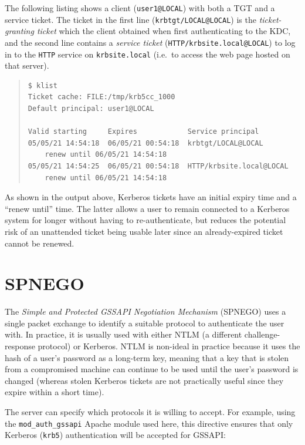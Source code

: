 \documentclass[12pt]{report}
\begin{document}
The following listing shows a client (\verb+user1@LOCAL+) with both a TGT and a service ticket. The ticket in the first line (\verb+krbtgt/LOCAL@LOCAL+) is the \textit{ticket-granting ticket} which the client obtained when first authenticating to the KDC, and the second line contains a \textit{service ticket} (\verb+HTTP/krbsite.local@LOCAL+) to log in to the \verb+HTTP+ service on \verb+krbsite.local+ (i.e.\ to access the web page hosted on that server).

\begin{quote}
\begin{samepage}
\begin{verbatim}
$ klist
Ticket cache: FILE:/tmp/krb5cc_1000
Default principal: user1@LOCAL

Valid starting     Expires            Service principal
05/05/21 14:54:18  06/05/21 00:54:18  krbtgt/LOCAL@LOCAL
	renew until 06/05/21 14:54:18
05/05/21 14:54:25  06/05/21 00:54:18  HTTP/krbsite.local@LOCAL
	renew until 06/05/21 14:54:18
\end{verbatim}
\end{samepage}
\end{quote}

As shown in the output above, Kerberos tickets have an initial expiry time and a ``renew until'' time. The latter allows a user to remain connected to a Kerberos system for longer without having to re-authenticate, but reduces the potential risk of an unattended ticket being usable later since an already-expired ticket cannot be renewed.

\section{SPNEGO}
The \textit{Simple and Protected GSSAPI Negotiation Mechanism} (SPNEGO) uses a single packet exchange to identify a suitable protocol to authenticate the user with. In practice, it is usually used with either NTLM (a different challenge-response protocol) or Kerberos. NTLM is non-ideal in practice because it uses the hash of a user's password as a long-term key, meaning that a key that is stolen from a compromised machine can continue to be used until the user's password is changed (whereas stolen Kerberos tickets are not practically useful since they expire within a short time).

The server can specify which protocols it is willing to accept. For example, using the \verb+mod_auth_gssapi+ Apache module used here, this directive ensures that only Kerberos (\texttt{krb5}) authentication will be accepted for GSSAPI:
\end{document}
